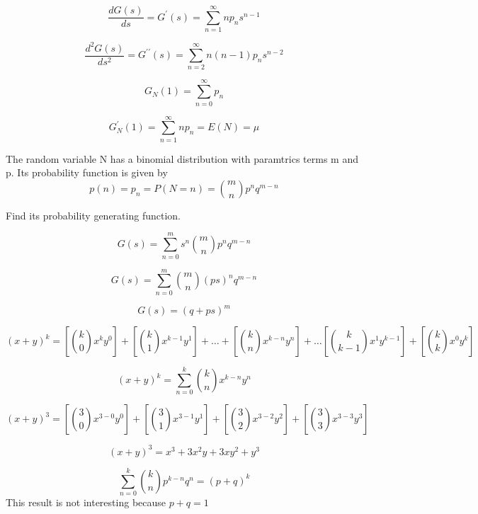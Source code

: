 \begin{equation}
\frac{dG(s)}{ds} = G^{\prime}(s) = \sum_{n=1}^{\infty}
np_{n}s^{n-1}
\end{equation}


\begin{equation}
\frac{d^2G(s)}{ds^2} = G^{\prime \prime}(s) =
\sum_{n=2}^{\infty}n(n-1)p_{n}s^{n-2}
\end{equation}

\begin{equation}
G_N(1) = \sum_{n=0}^{\infty} p_{n}
\end{equation}

\begin{equation}
G^{\prime}_N(1) = \sum_{n=1}^{\infty} np_{n}=E(N) = \mu
\end{equation}


The random variable N has a binomial distribution with paramtrics
terms m and p. Its probability function is given by
\begin{equation}
p(n) = p_n  = P(N=n) = {m \choose n}p^nq^{m-n}
\end{equation}

Find its probability generating function.

\begin{equation}
G(s) =  \sum_{n=0}^{m} s^n {m \choose n} p^nq^{m-n}
\end{equation}

\begin{equation}
G(s) =  \sum_{n=0}^{m} {m \choose n} (ps)^n q^{m-n}
\end{equation}


\begin{equation}
G(s) =  (q + ps)^m
\end{equation}


\[
(x + y)^k = [{k \choose 0}x^{k}y^{0}] + [{k \choose
	1}x^{k-1}y^{1}] +  \dots + [{k \choose n}x^{k-n}y^{n}] + \dots [{k
	\choose k-1}x^{1}y^{k-1}] + [ {k \choose k}x^{0}y^{k}]
\]

\[
(x + y)^k = \sum_{n=0}^{k} {k \choose n}x^{k-n}y^{n}
\]

\[
(x + y)^3 = \left[{3 \choose 0}x^{3-0}y^{0}\right] + \left[{3
	\choose 1}x^{3-1}y^{1}\right] +  \left[ {3 \choose
	2}x^{3-2}y^{2}\right] + \left[ {3 \choose 3}x^{3-3}y^{3}\right]
\]

\[
(x + y)^3 = x^{3} + 3x^2y + 3xy^2 + y^{3}
\]


\[
\sum_{n=0}^{k} {k \choose n}p^{k-n}q^{n} = (p + q)^k
\]
This result is not interesting because $p+q=1$

